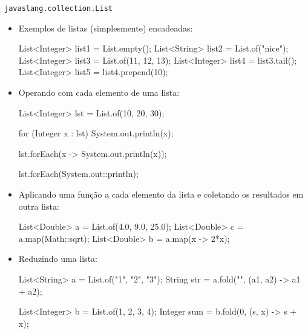\begin{frame}{\texttt{javaslang.collection.List}}
  \begin{itemize}
    \item Exemplos de listas (simplesmente) encadeadas:
\begin{pygmented}[]
List<Integer> list1 = List.empty();
List<String>  list2 = List.of("nice");
List<Integer> list3 = List.of(11, 12, 13);
List<Integer> list4 = list3.tail();
List<Integer> list5 = list4.prepend(10);
\end{pygmented}
    \begin{center}
    \end{center}

    \framebreak
    
    \item Operando com cada elemento de uma lista:
\begin{pygmented}[]
List<Integer> lst = List.of(10, 20, 30);

for (Integer x : lst)
  System.out.println(x);

lst.forEach(x -> System.out.println(x));

lst.forEach(System.out::println);
\end{pygmented}

    \framebreak
    
    \item Aplicando uma função a cada elemento da lista e coletando os
    resultados em outra lista:
\begin{pygmented}[]
List<Double> a = List.of(4.0, 9.0, 25.0);
List<Double> c = a.map(Math::sqrt);
List<Double> b = a.map(x -> 2*x);
\end{pygmented}

    \framebreak
    
    \item Reduzindo uma lista:
\begin{pygmented}[]
List<String> a = List.of("1", "2", "3");
String str = a.fold("", (a1, a2) -> a1 + a2);

List<Integer> b = List.of(1, 2, 3, 4);
Integer sum = b.fold(0, (s, x) -> s + x);
\end{pygmented}

  \end{itemize}
\end{frame}



